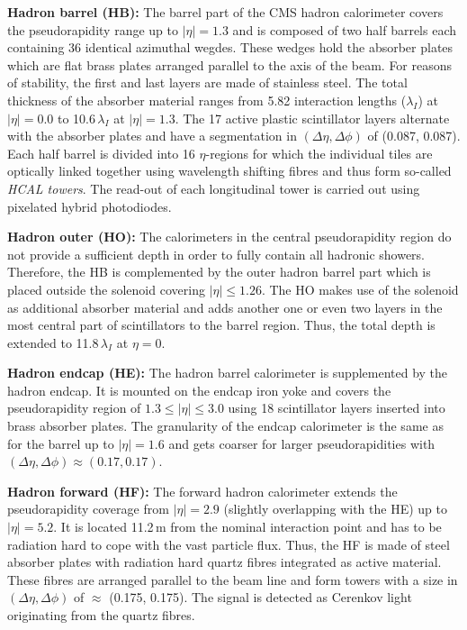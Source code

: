 \begin{description}
 \item \textbf{Hadron barrel (HB):} The barrel part of the CMS hadron calorimeter covers the pseudorapidity range up to $|\eta| = 1.3$ and is composed of two half barrels each containing 36 identical azimuthal wegdes. These wedges hold the absorber plates which are flat brass plates arranged parallel to the axis of the beam. For reasons of stability, the first and last layers are made of stainless steel. The total thickness of the absorber material ranges from 5.82 interaction lengths ($\lambda_I$) at $|\eta| = 0.0$ to 10.6\,$\lambda_I$ at $|\eta| = 1.3$. The 17 active plastic scintillator layers alternate with the absorber plates and have a segmentation in $(\Delta \eta, \Delta \phi)$ of (0.087, 0.087).\\
Each half barrel is divided into 16 $\eta$-regions for which the individual tiles are optically linked together using wavelength shifting fibres and thus form so-called \textit{HCAL towers}. The read-out of each longitudinal tower is carried out using pixelated hybrid photodiodes.
 \item \textbf{Hadron outer (HO):} The calorimeters in the central pseudorapidity region do not provide a sufficient depth in order to fully contain all hadronic showers. Therefore, the HB is complemented by the outer hadron barrel part which is placed outside the solenoid covering $|\eta| \le 1.26$. The HO makes use of the solenoid as additional absorber material and adds another one or even two layers in the most central part of scintillators to the barrel region. Thus, the total depth is extended to 11.8\,$\lambda_I$ at $\eta = 0$.
 \item \textbf{Hadron endcap (HE):} The hadron barrel calorimeter is supplemented by the hadron endcap. It is mounted on the endcap iron yoke and covers the pseudorapidity region of $1.3 \le |\eta| \le 3.0$ using 18 scintillator layers inserted into brass absorber plates. The granularity of the endcap calorimeter is the same as for the barrel up to $|\eta| = 1.6$ and gets coarser for larger pseudorapidities with $(\Delta \eta, \Delta \phi) \approx (0.17, 0.17)$.
 \item \textbf{Hadron forward (HF):} The forward hadron calorimeter extends the pseudorapidity coverage from $|\eta| = 2.9$ (slightly overlapping with the HE) up to $|\eta| = 5.2$. It is located 11.2\,m from the nominal interaction point and has to be radiation hard to cope with the vast particle flux. Thus, the HF is made of steel absorber plates with radiation hard quartz fibres integrated as active material. These fibres are arranged parallel to the beam line and form towers with a size in $(\Delta \eta, \Delta \phi)$ of $\approx$ (0.175, 0.175). The signal is detected as Cerenkov light originating from the quartz fibres.
\end{description}
